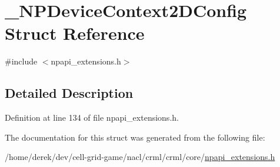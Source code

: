 \hypertarget{struct___n_p_device_context2_d_config}{
\section{\_\-NPDeviceContext2DConfig Struct Reference}
\label{struct___n_p_device_context2_d_config}
}


{\ttfamily \#include $<$npapi\_\-extensions.h$>$}



\subsection{Detailed Description}


Definition at line 134 of file npapi\_\-extensions.h.



The documentation for this struct was generated from the following file:\begin{DoxyCompactItemize}
\item 
/home/derek/dev/cell-\/grid-\/game/nacl/crml/crml/core/\hyperlink{npapi__extensions_8h}{npapi\_\-extensions.h}\end{DoxyCompactItemize}
